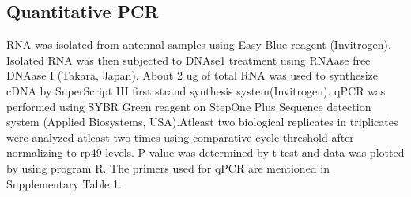 \subsection*{Quantitative PCR}

RNA was isolated from antennal samples using Easy Blue reagent (Invitrogen). Isolated RNA was then subjected to DNAse1 treatment using RNAase free DNAase I (Takara, Japan). About 2 ug of total RNA was used to synthesize cDNA by SuperScript III first strand synthesis system(Invitrogen). qPCR was performed using SYBR Green reagent on StepOne Plus Sequence detection system (Applied Biosystems, USA).Atleast two biological replicates in triplicates were analyzed atleast two times using comparative cycle threshold after normalizing to rp49 levels. P value was determined by t-test and data was plotted by using program R. The primers used for qPCR are mentioned in Supplementary Table 1.